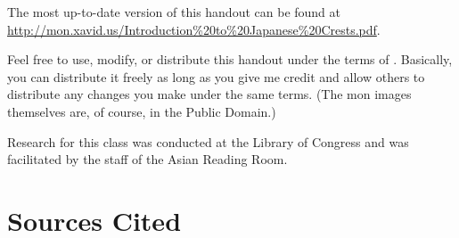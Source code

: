 \documentclass{article}
\begin{document}
  The most up-to-date version of this handout can be found at\\
  \url{http://mon.xavid.us/Introduction\%20to\%20Japanese\%20Crests.pdf}.

  Feel free to use, modify, or distribute this handout under the terms
  of .  Basically, you
  can distribute it freely as long as you give me credit and allow
  others to distribute any changes you make under the same terms.
  (The mon images themselves are, of course, in the Public Domain.)

  Research for this class was conducted at the Library of Congress and was facilitated by the staff of the Asian Reading Room.

\section{Sources Cited}

\begin{description}
\cited
\end{description}
\end{document}
